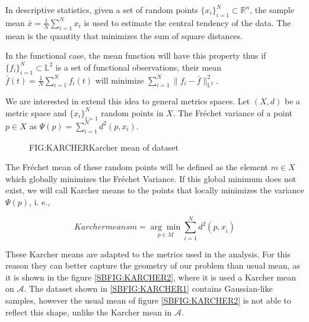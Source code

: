In descriptive statistics, given a set of random points
$\{x_i\}_{i=1}^{N} \subset \mathbb{R}^n$, the sample mean
$\bar x = \frac{1}{N}\sum_{i=1}^{N} x_i$ is used to estimate the central
tendency of the data. The mean is the quantity that minimizes the sum of square distances.

In the functional case, the mean function will have this property thus if
$\{f_i\}_{i=1}^{N} \subset \mathbb{L}^2$ is a set of functional observations,
their mean $\bar f(t) = \frac{1}{N}\sum_{i=1}^{N} f_i(t)$ will minimize
$\sum_{i=1}^{N}\|f_i - \bar f\|_{\mathbb{L}^2}^2$.

We are interested in extend this idea to general metrics spaces.
Let $(X, d)$ be a metric space and $\{x_i\}_{i=1}^{N}$ random points in $X$.
The Fréchet variance of a point $p \in X$ as $\Psi(p)=\sum_{i=1}^{N} d^{2}\left(p, x_{i}\right)$.

\begin{figure}[Karcher mean of dataset]{FIG:KARCHER}{Karcher mean of dataset}
	 \quad
	 \\
	 \quad
\end{figure}

The Fréchet mean of these random points will be defined as the element $m \in X$
which globally minimizes the Fréchet Variance. If this global minimum does not
exist, we will call Karcher means to the points that locally minimizes the variance
$\Psi(p)$, i. e.,

\begin{equation}[]{Karcher means}
m=\underset{p \in M}{\arg \min } \sum_{i=1}^{N} d^{2}\left(p, x_{\dot{i}}\right)
\end{equation}

These Karcher means are adapted to the metrics used in the analysis. For this reason they can better capture the geometry of our problem
than usual mean, as it is shown in the figure \ref{SBFIG:KARCHER2}, where it is
used a Karcher mean on $\mathscr{A}$.
The dataset shown in \ref{SBFIG:KARCHER1} contains Gaussian-like
samples, however the usual mean of figure \ref{SBFIG:KARCHER2} is not able to reflect
this shape, unlike the Karcher mean in $\mathscr{A}$.



